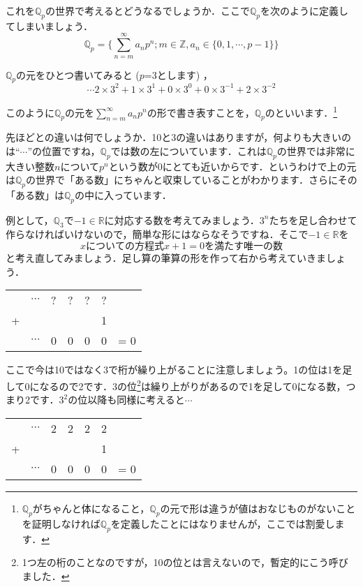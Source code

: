 \documentclass[./main]{subfiles}
\theoremstyle{definition}
\newcommand{\Z}{\mathbb{Z}}%
\newcommand{\Q}{\mathbb{Q}}%
\newcommand{\Qp}{\mathbb{Q}_p}%
\newcommand{\R}{\mathbb{R}}%
\begin{document}
これを$\Qp$の世界で考えるとどうなるでしょうか．ここで$\Qp$を次のように定義してしまいましょう．
\[
\Qp=\bigl\{ \sum^\infty_{n=m} a_n p^n ; m\in \Z , a_n \in \{ 0,1,\cdots ,p-1\} \bigr\}
\]

$\Qp$の元をひとつ書いてみると ($p$=3とします) ，
\[
\cdots2 \times 3^2 + 1 \times 3^1 + 0 \times 3^0 + 0\times 3^{-1} + 2 \times 3^{-2}
\]

このように$\Qp$の元を$\sum^\infty_{n=m} a_n p^n$の形で書き表すことを，$\Qp$のといいます．\footnote{$\Qp$がちゃんと体になること，$\Qp$の元で形は違うが値はおなじものがないことを証明しなければ$\Qp$を定義したことにはなりませんが，ここでは割愛します．}

先ほどとの違いは何でしょうか．10と3の違いはありますが，何よりも大きいのは``$\cdots$''の位置ですね，$\Qp$では数の左についています．これは$\Qp$の世界では非常に大きい整数$n$について$p^n$という数が0にとても近いからです．というわけで上の元は$\Qp$の世界で「ある数」にちゃんと収束していることがわかります．さらにその「ある数」は$\Qp$の中に入っています．

例として，$\Q_3$で$-1\in\R$に対応する数を考えてみましょう．$3^n$たちを足し合わせて作らなければいけないので，簡単な形にはならなそうですね．そこで$-1\in\R$を
\[
xについての方程式 x+1=0 を満たす唯一の数
\]
と考え直してみましょう．足し算の筆算の形を作って右から考えていきましょう．

\begin{center}
\begin{tabular}{ccccccr}
	 &$\cdots$&?&?&?&?& \\ 
	+& & & & &1& \\ \cline{1-6} 
	 &$\cdots$&0&0&0&0& = 0\\
\end{tabular}
\end{center}

ここで今は10ではなく3で桁が繰り上がることに注意しましょう。1の位は1を足して0になるので2です．3の位\footnote{1つ左の桁のことなのですが，10の位とは言えないので，暫定的にこう呼びました．}は繰り上がりがあるので1を足して0になる数，つまり2です．$3^2$の位以降も同様に考えると$\cdots$

\begin{center}
\begin{tabular}{ccccccr}
	 &$\cdots$&2&2&2&2& \\ 
	+& & & & &1& \\ \cline{1-6} 
	 &$\cdots$&0&0&0&0& = 0\\
\end{tabular}
\end{center}
\end{document}
